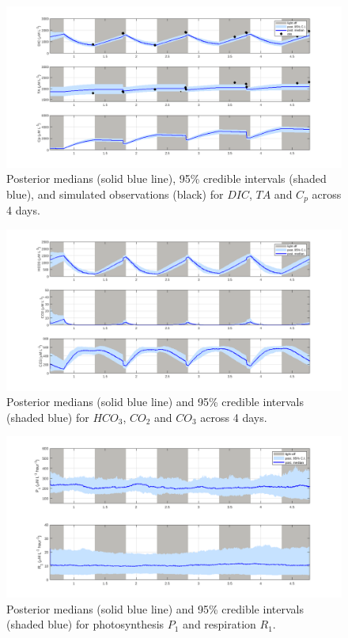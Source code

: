 \documentclass{ruthesis}
\begin{document}
\begin{figure}
	\centerline{\includegraphics[width=1.2\textwidth]{images_microalgae/plots_chris_offset/DIC_TA_Cp}}
	\caption[.]{Posterior medians (solid blue line), 95\% credible intervals (shaded blue), and simulated observations (black) for $DIC$, $TA$ and $C_p$ across 4 days.}
	\label{fig:micro_exp_offset_DIC_TA_Cp}
\end{figure}

\begin{figure}
	\centerline{\includegraphics[width=1.2\textwidth]{images_microalgae/plots_chris_offset/carbon}}
	\caption[.]{Posterior medians (solid blue line) and 95\% credible intervals (shaded blue) for $HCO_3$, $CO_2$ and $CO_3$ across 4 days.}
	\label{fig:micro_exp_offset_carbon}
\end{figure}

\begin{figure}
	\centerline{\includegraphics[width=1.2\textwidth]{images_microalgae/plots_chris_offset/P_and_R}}
	\caption[.]{Posterior medians (solid blue line) and 95\% credible intervals (shaded blue) for photosynthesis $P_1$ and respiration $R_1$.}
	\label{fig:micro_exp_offset_P_R}
\end{figure}
\end{document}
